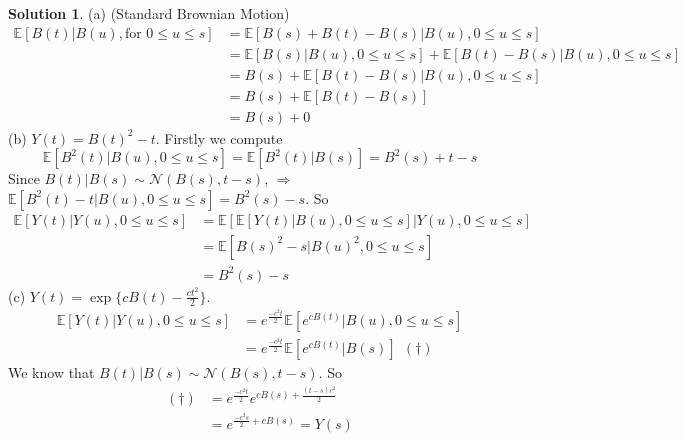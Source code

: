 \documentclass[a4paper, 10pt]{article}
\theoremstyle{definition}
\theoremstyle{hSol}
\newtheorem*{solution}{Solution}
\begin{document}
\begin{solution} (a) (Standard Brownian Motion)
\begin{equation}
  \begin{split}
    \mathbb{E}\left[B(t)|B(u), \text{for }0\leq u\leq s\right] &= \mathbb{E}\left[B(s)+B(t)-B(s)|B(u), 0\leq u\leq s\right] \\
    &= \mathbb{E}\left[B(s)|B(u), 0\leq u\leq s\right] + \mathbb{E}\left[B(t)-B(s)|B(u), 0\leq u\leq s\right]\\
    &= B(s) + \mathbb{E}\left[B(t)-B(s)|B(u), 0\leq u\leq s\right]\\
    &= B(s) + \mathbb{E}\left[B(t)-B(s)\right] \\
    &= B(s) + 0
  \end{split}
\end{equation}
(b) $Y(t)=B(t)^2 - t$. Firstly we compute
\begin{equation}
  \mathbb{E}\left[B^2(t)|B(u), 0\leq u\leq s\right] = \mathbb{E}\left[B^2(t)|B(s)\right] = B^2(s) + t-s
\end{equation}
Since $B(t)|B(s)\sim \mathcal{N}(B(s), t-s)$, $\Rightarrow$ $\mathbb{E}\left[B^2(t)-t|B(u), 0\leq u\leq s\right]=B^2(s)-s$. So
\begin{equation}
  \begin{split}
    \mathbb{E}\left[Y(t)|Y(u), 0\leq u\leq s\right] &= \mathbb{E}\left[\mathbb{E}\left[Y(t)|B(u), 0\leq u\leq s\right]|Y(u), 0\leq u\leq s\right] \\
    &= \mathbb{E}\left[B(s)^2-s|B(u)^2, 0\leq u\leq s\right] \\
    &= B^2(s)-s
  \end{split}
\end{equation}
(c) $Y(t)=\exp\{cB(t)-\frac{ct^2}{2}\}$. 
\begin{equation}
  \begin{split}
    \mathbb{E}\left[Y(t)|Y(u), 0\leq u\leq s\right] &= e^{\frac{-c^2t}{2}} \mathbb{E}\left[e^{cB(t)}|B(u), 0\leq u\leq s\right]\\
    &= e^{\frac{-c^2t}{2}} \mathbb{E}\left[e^{cB(t)}|B(s)\right]~~(\dag)
  \end{split}
\end{equation}
We know that $B(t)|B(s)\sim \mathcal{N}(B(s), t-s)$. So
\begin{equation}
  \begin{split}
    (\dag) &= e^{\frac{-c^2t}{2}} e^{cB(s)+\frac{(t-s)c^2}{2}} \\
    &= e^{\frac{-c^2s}{2}+cB(s)} = Y(s)
  \end{split}
\end{equation}
\end{solution}
\end{document}
